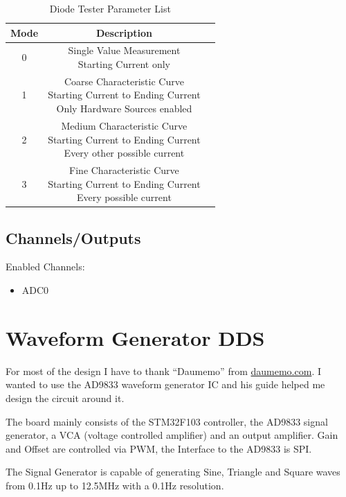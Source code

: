 \begin{table}[H]
    \centering
    \begin{tabular}{|c|c|l|}
        \hline
        \textbf{Mode}   &  \multicolumn{1}{|c|}{\textbf{Description}}\\ \hline \hline
        0   &  \makecell[l]{Single Value Measurement \\ Starting Current only}\\ \hline
		1   &  \makecell[l]{Coarse Characteristic Curve \\ Starting Current to Ending Current \\ Only Hardware Sources enabled}\\ \hline
		2   &  \makecell[l]{Medium Characteristic Curve \\ Starting Current to Ending Current \\ Every other possible current}\\ \hline
		3   &  \makecell[l]{Fine Characteristic Curve \\ Starting Current to Ending Current \\ Every possible current}\\ \hline
    \end{tabular}
	\caption{Diode Tester Parameter List}
\label{tab:Modes-Diode}
\end{table}
\subsection{Channels/Outputs}
Enabled Channels:
\begin{itemize}
	\item ADC0
\end{itemize}
\section{Waveform Generator DDS}
For most of the design I have to thank ``Daumemo'' from \textcolor{blue}{\href{https://daumemo.com}{daumemo.com}}. I wanted to use the AD9833 waveform generator IC and his guide helped me design the circuit around it. 

The board mainly consists of the STM32F103 controller, the AD9833 signal generator, a VCA (voltage controlled amplifier) and an output amplifier. Gain and Offset are controlled via PWM, the Interface to the AD9833 is SPI. 

The Signal Generator is capable of generating Sine, Triangle and Square waves from 0.1Hz up to 12.5MHz with a 0.1Hz resolution. 


